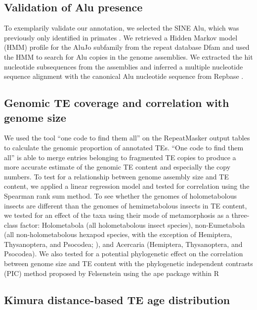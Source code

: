\subsection{Validation of Alu presence}

To exemplarily validate our annotation, we selected the SINE Alu, which
was previously only identified in primates \citep{Kriegs2007}. We
retrieved a Hidden Markov model (HMM) profile for the AluJo subfamily
from the repeat database Dfam \citep{Hubley2015} and used the HMM to
search for Alu copies in the genome assemblies. We extracted the hit
nucleotide subsequences from the assemblies and inferred a multiple
nucleotide sequence alignment with the canonical Alu nucleotide sequence
from Repbase \citep{Jurka2005}.

\subsection{Genomic TE coverage and correlation with genome size}

We used the tool ``one code to find them all'' \citep{Bailly-Bechet2014}
on the RepeatMasker output tables to calculate the genomic proportion of
annotated TEs. ``One code to find them all'' is able to merge entries
belonging to fragmented TE copies to produce a more accurate estimate of
the genomic TE content and especially the copy numbers. To test for a
relationship between genome assembly size and TE content, we applied a
linear regression model and tested for correlation using the Spearman
rank sum method. To see whether the genomes of holometabolous insects
are different than the genomes of hemimetabolous insects in TE content,
we tested for an effect of the taxa using their mode of metamorphosis as
a three-class factor: Holometabola (all holometabolous insect species),
non-Eumetabola (all non-holometabolous hexapod species, with the
exception of Hemiptera, Thysanoptera, and Psocodea; \citep{Beutel2013}),
and Acercaria (Hemiptera, Thysanoptera, and Psocodea). We also tested
for a potential phylogenetic effect on the correlation between genome
size and TE content with the phylogenetic independent contrasts (PIC)
method proposed by Felsenstein \citep{Felsenstein1985} using the ape
package \citep{Paradis2004} within R \citep{RCoreTeam2017}





\subsection{Kimura distance-based TE age distribution}

